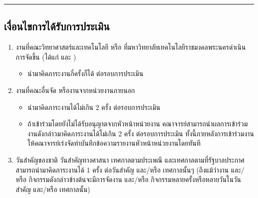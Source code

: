 \documentclass[a4paper,12pt,english]{sphinxmanual}
\begin{document}
\bigskip\hrule\bigskip



\subsection{เงื่อนไขการได้รับการประเมิน}
\label{\detokenize{workload_rubric:id74}}\begin{enumerate}
%
\item {} 
งานที่คณะวิทยาศาสตร์และเทคโนโลยี หรือ ที่มหาวิทยาลัยเทคโนโลยีราชมงคลพระนครดำเนินการจัดขึ้น (ได้แก่ {\hyperref[\detokenize{workload_rubric:id76}]{}} และ {\hyperref[\detokenize{workload_rubric:id85}]{}})
\begin{itemize}
\item {} 
นำมาคิดภาระงานกี่ครั้งก็ได้ ต่อรอบการประเมิน

\end{itemize}

\item {} 
งานที่คณะอื่นจัด หรืองานจากหน่วยงานภายนอก
\begin{itemize}
\item {} 
นำมาคิดภาระงานได้ไม่เกิน 2 ครั้ง ต่อรอบการประเมิน

\item {} 
ถ้าเข้าร่วมโดยยังไม่ได้รับอนุญาตจากหัวหน้าหน่วยงาน คณาจารย์สามารถนำผลการเข้าร่วมงานดังกล่าวมาคิดภาระงานได้ไม่เกิน 2 ครั้ง ต่อรอบการประเมิน ทั้งนี้ภายหลังการเข้าร่วมงานให้คณาจารย์เร่งจัดทำบันทึกข้อความรายงานหัวหน้าหน่วยงานโดยทันที

\end{itemize}

\item {} 
วันสำคัญของชาติ วันสำคัญทางศาสนา เทศกาลตามประเพณี และเทศกาลตามที่รัฐบาลประกาศ สามารถนำมาคิดภาระงานได้ 1 ครั้ง ต่อวันสำคัญ และ/หรือ เทศกาลนั้นๆ (ถึงแม้ว่างาน และ/หรือ กิจกรรมดังกล่าวข้างต้นจะมีการจัดงาน และ/หรือ กิจกรรมหลายครั้งหรือหลายวันในวันสำคัญ และ/หรือ เทศกาลนั้น)

\end{enumerate}
\end{document}
